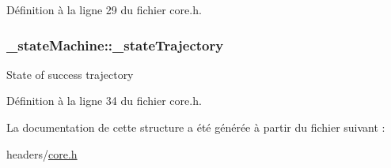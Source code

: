 Définition à la ligne 29 du fichier core.\-h.

\hypertarget{struct__state_machine_a88c6e0c15cdd29b3eec2e842fa09b08f}{
\subsubsection[{\-\_\-state\-Trajectory}]{ \-\_\-state\-Machine\-::\-\_\-state\-Trajectory}}\label{struct__state_machine_a88c6e0c15cdd29b3eec2e842fa09b08f}
State of success trajectory 

Définition à la ligne 34 du fichier core.\-h.



La documentation de cette structure a été générée à partir du fichier suivant \-:\begin{DoxyCompactItemize}
\item 
headers/\hyperlink{core_8h}{core.\-h}\end{DoxyCompactItemize}
